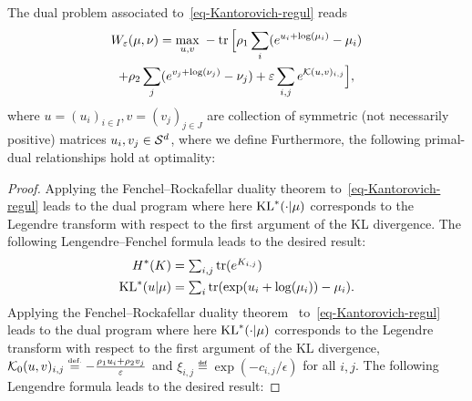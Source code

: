 \begin{prop}
	The dual problem associated to~\eqref{eq-Kantorovich-regul} reads
	\begin{multline}\label{eq-dual-pb}
		W_\varepsilon(\mu,\nu)
		= 
		\underset{u,v}{\max}\; - 
				\operatorname{tr}\Big[
						\rho_1 \sum_i (e^{u_i+\log(\mu_i)} - \mu_i) \\
					+   \rho_2 \sum_j (e^{v_j+\log(\nu_j)} - \nu_j)
					+    \varepsilon \sum_{i,j}  e^{ \mathcal{K}(u,v)_{i,j} }
			 \Big], 
	\end{multline}	
	where $u=(u_i)_{i \in I}, v=(v_j)_{j \in J}$ are collection of symmetric (not necessarily positive) matrices $u_i, v_j \in \mathcal{S}^d$, 
	where we define
	Furthermore, the following primal-dual relationships hold at optimality:
\end{prop}
\begin{proof} 
Applying the Fenchel--Rockafellar duality theorem  to~\eqref{eq-Kantorovich-regul} leads to the dual program
where here $\operatorname{KL}^*(\cdot|\mu)$ corresponds to the Legendre transform with respect to the first argument of the KL divergence.
%
The following Lengendre--Fenchel  formula leads to the desired result:
\begin{align*} %
	H^*(K) &= \textstyle\sum_{i,j} \tr( e^{K_{i,j}} ) \\
	\KL^*(u|\mu) &= \textstyle\sum_i \tr( \exp(u_i+\log(\mu_i)) - \mu_i).
\end{align*}
%
\fi
Applying the Fenchel--Rockafellar duality theorem~\cite{rockafellar-convex} to~\eqref{eq-Kantorovich-regul} leads to the dual program
where here $\operatorname{KL}^*(\cdot|\mu)$ corresponds to the Legendre transform with respect to the first argument of the KL divergence, $ \Kern_0(u,v)_{i,j} \eqdef -\frac{\rho_1 u_i + \rho_2 v_j}{\epsilon}$ and $\xi_{i,j} \eqdef \exp(-c_{i,j}/\epsilon)$ for all $i,j$.
%
The following Lengendre formula leads to the desired result:
\end{proof}




